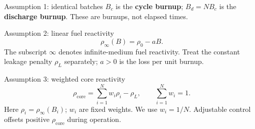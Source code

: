 \documentclass[compact]{ne630handout}
\begin{document}
\begin{minipage}[t]{0.485\textwidth}
\begin{fixedbox}{Assumption 1: identical batches}
$B_c$ is the \textbf{cycle burnup}; $B_d=NB_c$ is the \textbf{discharge burnup}. These are burnups, not elapsed times.
\end{fixedbox}

\begin{fixedbox}{Assumption 2: linear fuel reactivity}
\[
 \boxed{\rho_\infty(B)=\rho_0-aB.}
\]
The subscript $\infty$ denotes infinite-medium fuel reactivity. Treat the constant leakage penalty $\rho_L$ separately; $a>0$ is the loss per unit burnup.
\end{fixedbox}

\begin{fixedbox}{Assumption 3: weighted core reactivity}
\[
 \boxed{\rho_{\mathrm{core}}=\sum_{i=1}^{N}w_i\rho_i-\rho_L},
 \qquad \boxed{\sum_{i=1}^{N}w_i=1}.
\]
Here $\rho_i=\rho_\infty(B_i)$; $w_i$ are fixed weights. We use $w_i=1/N$. Adjustable control offsets positive $\rho_{\mathrm{core}}$ during operation.
\end{fixedbox}
\end{minipage}

\newpage
{}
\end{document}
